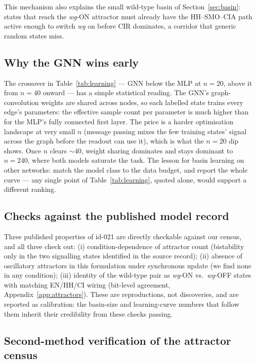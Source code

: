 This mechanism also explains the small wild-type basin of
Section~\ref{sec:basin}: states that reach the \emph{wg}-ON attractor must
already have the HH--SMO--CIA path active enough to switch \emph{wg} on
before CIR dominates, a corridor that generic random states miss.

\subsection{Why the GNN wins early}

The crossover in Table~\ref{tab:learning} --- GNN below the MLP at $n = 20$,
above it from $n = 40$ onward --- has a simple statistical reading. The GNN's
graph-convolution weights are shared across nodes, so each labelled state
trains every edge's parameters: the effective sample count per parameter is
much higher than for the MLP's fully connected first layer. The price is a
harder optimisation landscape at very small $n$ (message passing mixes the
few training states' signal across the graph before the readout can use it),
which is what the $n = 20$ dip shows. Once $n$ clears $\sim 40$, weight
sharing dominates and stays dominant to $n = 240$, where both models saturate
the task. The lesson for basin learning on other networks: match the model
class to the data budget, and report the whole curve --- any single point of
Table~\ref{tab:learning}, quoted alone, would support a different ranking.

\subsection{Checks against the published model record}

Three published properties of id-021 are directly checkable against our
census, and all three check out: (i) condition-dependence of attractor count
(bistability only in the two signalling states identified in the source
record); (ii) absence of oscillatory attractors in this formulation under
synchronous update (we find none in any condition); (iii) identity of the
wild-type pair as \emph{wg}-ON vs.\ \emph{wg}-OFF states with matching
EN/HH/CI wiring (bit-level agreement, Appendix~\ref{app:attractors}). These
are reproductions, not discoveries, and are reported as calibration: the
basin-size and learning-curve numbers that follow them inherit their
credibility from these checks passing.

\subsection{Second-method verification of the attractor census}

